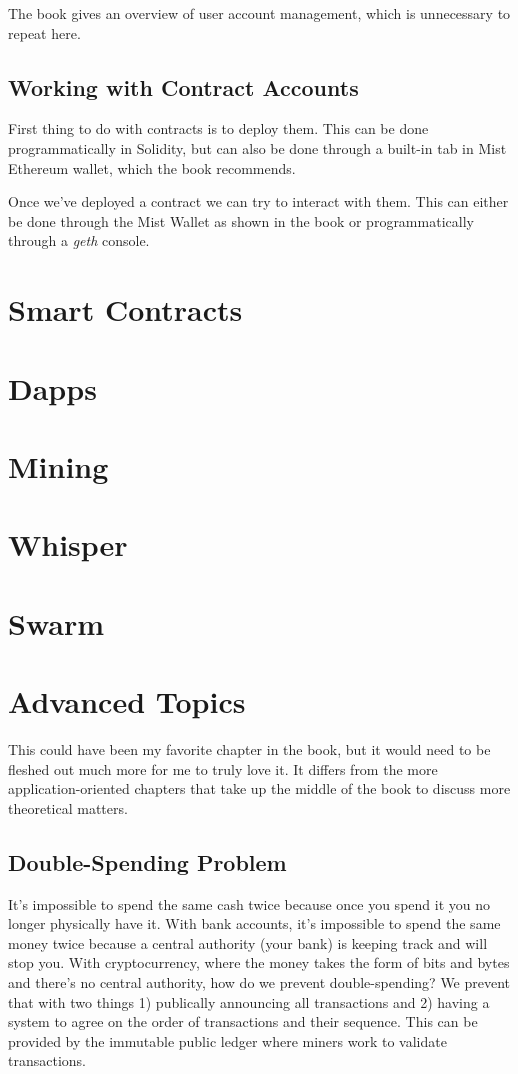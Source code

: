 \documentclass{article}
\begin{document}
The book gives an overview of user account management, which is unnecessary to repeat here.

\subsection{Working with Contract Accounts}
First thing to do with contracts is to deploy them. This can be done programmatically in Solidity, but can also be done through a built-in
tab in Mist Ethereum wallet, which the book recommends.

Once we've deployed a contract we can try to interact with them. This can either be done through the Mist Wallet as shown in the book or programmatically through a \textit{geth} console.

\section{Smart Contracts}

\section{Dapps}

\section{Mining}

\section{Whisper}

\section{Swarm}

\section{Advanced Topics}
This could have been my favorite chapter in the book, but it would need to be fleshed out much more for me to truly love it. It
differs from the more application-oriented chapters that take up the middle of the book to discuss more theoretical matters.

\subsection{Double-Spending Problem}
It's impossible to spend the same cash twice because once you spend it you no longer physically have it. With bank accounts, it's impossible to spend the same money twice because a central authority (your bank) is keeping track and will stop you. With
cryptocurrency, where the money takes the form of bits and bytes and there's no central authority, how do we prevent double-spending? We prevent that with two things 1) publically announcing all transactions and 2) having a system to agree on the order
of transactions and their sequence. This can be provided by the immutable public ledger where miners work to validate transactions.
\end{document}
